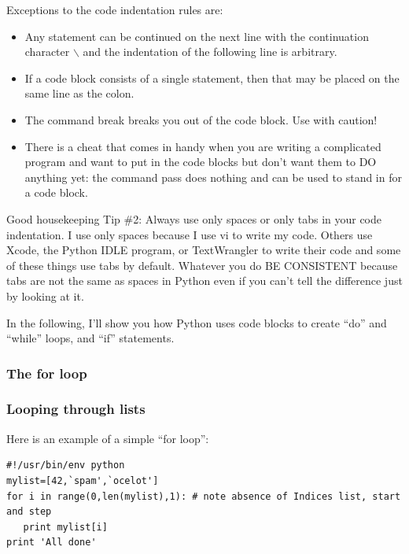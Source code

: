 \documentclass[11pt]{book}
\begin{document}
{{{\noindent Exceptions to the code indentation rules are:
\begin{itemize}
\item  Any statement can be continued on the next line with the continuation character $\backslash$ and the indentation of the following line is arbitrary.  \item If a code block consists of a single statement, then that may be placed on the same line as the colon. 
\item The command {\color{blue}break} breaks you out of the code block. Use with caution!
\item There is a cheat that comes in handy when you are writing a complicated program and want to put in the code blocks but don't want them to DO anything yet:  the command  {\color{blue} pass} does nothing and can be used to stand in for a code block.
\end{itemize}

{ \color{magenta}Good housekeeping Tip \#2: Always use only spaces or only tabs in your code indentation.  I use only spaces because I use {\color{blue}vi} to write my code.  Others use Xcode, the  Python IDLE program, or TextWrangler to write their code and some of these things use tabs by default.  Whatever you do BE CONSISTENT because tabs are not the same as spaces in Python even if you can't tell the difference just by looking at it.}




In the following, I'll show you how Python uses code blocks  to create ``do'' and ``while'' loops, and ``if'' statements.

\subsubsection{The for loop}
\subsubsection{Looping through lists}

Here is an example of a simple  ``for loop'':   


{ \color{blue} \begin{verbatim}
#!/usr/bin/env python
mylist=[42,`spam',`ocelot']
for i in range(0,len(mylist),1): # note absence of Indices list, start and step
   print mylist[i]
print 'All done' 
\end{verbatim}}

}}}
\end{document}
